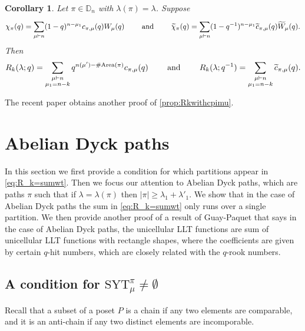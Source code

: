\documentclass[12pt,reqno]{amsart}
\theoremstyle{plain}
\newtheorem{corollary}[theorem]{Corollary}
\theoremstyle{definition}
\theoremstyle{remark}
\theoremstyle{example}
\numberwithin{equation}{section}
\newcommand{\SYT}{\mathrm{SYT}}
\newcommand{\Area}{\mathrm{Area}}
\newcommand{\DD}{\mathbb{D}}
\begin{document}
\begin{corollary}\label{prop:Rkwithcpimu}
	Let $\pi \in \DD_n$ with $\lambda(\pi) = \lambda$. Suppose \begin{align*}
		\chi_\pi(q) = \sum_{\mu \vdash n} (1-q)^{n-\mu_1} c_{\pi,\mu}(q) W_\mu(q) \qquad \hbox{ and } \qquad \widetilde{\chi}_\pi(q) = \sum_{\mu \vdash n}^{} (1-q^{-1})^{n-\mu_1} \widetilde{c}_{\pi,\mu}(q) \widetilde{W}_\mu(q).
	\end{align*}
	Then
	\begin{align*}
R_k(\lambda;q) =		\sum_{\substack{\mu \vdash n \\ \mu_1 = n-k}} q^{n(\mu')-\# \Area(\pi)} c_{\pi,\mu}(q) \qquad \hbox{ and } \qquad R_k(\lambda;q^{-1}) = \sum_{\substack{\mu \vdash n \\ \mu_1 = n-k}} \widetilde{c}_{\pi,\mu}(q).
	\end{align*}
\end{corollary}
The recent paper \cite{kim2025halllittlewoodexpansionschromaticquasisymmetric} obtains another proof of \autoref{prop:Rkwithcpimu}.

\section{Abelian Dyck paths}

In this section we first provide a condition for which partitions appear in \eqref{eq:R_k=sumwt}. Then we focus our attention to Abelian Dyck paths, which are paths $\pi$ such that if $\lambda = \lambda(\pi)$ then $|\pi|\geq \lambda_1 + \lambda'_1$. We show that in the case of Abelian Dyck paths the sum in \eqref{eq:R_k=sumwt} only runs over a single partition. We then provide another proof of a result of Guay-Paquet that says in the case of Abelian Dyck paths, the unicellular LLT functions are sum of unicellular LLT functions with rectangle shapes, where the coefficients are given by certain $q$-hit numbers, which are closely related with the $q$-rook numbers.

\subsection{A condition for $\SYT^\pi_\mu \neq \emptyset$}
Recall that a subset of a poset $P$ is a chain if any two elements are comparable, and it is an anti-chain if any two distinct elements are incomporable.
\end{document}
